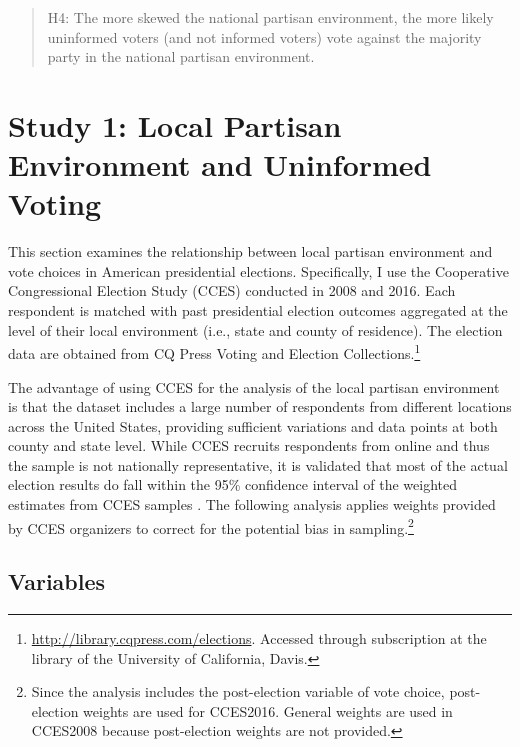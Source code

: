 \documentclass[letterpaper, 12pt]{article}
\begin{document}
    \begin{verse}
        H4: The more skewed the national partisan environment, the more likely uninformed voters (and not informed voters) vote against the majority party in the national partisan environment. 
    \end{verse}

    \section*{Study 1: Local Partisan Environment and Uninformed Voting}

    \par This section examines the relationship between local partisan environment and vote choices in American presidential elections. Specifically, I use the Cooperative Congressional Election Study (CCES) conducted in 2008 and 2016. Each respondent is matched with past presidential election outcomes aggregated at the level of their local environment (i.e., state and county of residence). The election data are obtained from CQ Press Voting and Election Collections.\footnote{\url{http://library.cqpress.com/elections}. Accessed through subscription at the library of the University of California, Davis.}
    
    \par The advantage of using CCES for the analysis of the local partisan environment is that the dataset includes a large number of respondents from different locations across the United States, providing sufficient variations and data points at both county and state level. While CCES recruits respondents from online and thus the sample is not nationally representative, it is validated that most of the actual election results do fall within the 95\% confidence interval of the weighted estimates from CCES samples \citep{Ansolabehere2011guto, Ansolabehere2017guto}. The following analysis applies weights provided by CCES organizers to correct for the potential bias in sampling.\footnote{Since the analysis includes the post-election variable of vote choice, post-election weights are used for CCES2016. General weights are used in CCES2008 because post-election weights are not provided.}

    \subsection*{Variables}
    
\end{document}
